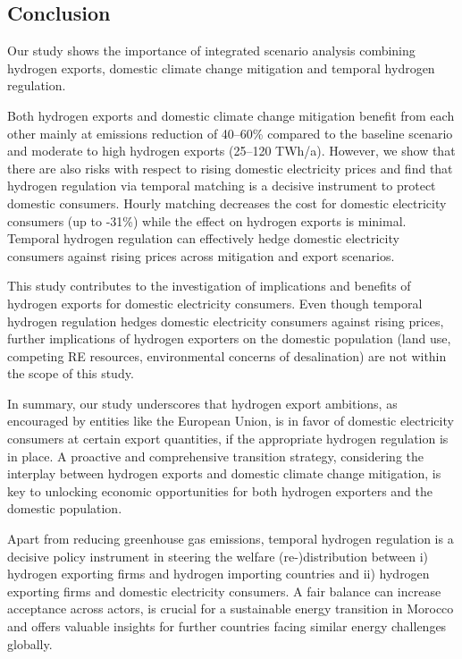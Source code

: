 \subsection*{Conclusion}


Our study shows the importance of integrated scenario analysis combining hydrogen exports, domestic climate change mitigation and temporal hydrogen regulation.

Both hydrogen exports and domestic climate change mitigation benefit from each other mainly at emissions reduction of 40--60\% compared to the baseline scenario and moderate to high hydrogen exports (25--120 TWh/a).
However, we show that there are also risks with respect to rising domestic electricity prices
and find that hydrogen regulation via temporal matching is a decisive instrument
to protect domestic consumers. Hourly matching decreases the cost for domestic electricity consumers (up to -31\%) while the effect on hydrogen exports is minimal. Temporal hydrogen regulation can effectively hedge domestic electricity consumers against rising prices across mitigation and export scenarios.

This study contributes to the investigation of implications and benefits of hydrogen exports for domestic electricity consumers. Even though temporal hydrogen regulation hedges domestic electricity consumers against rising prices, further implications of hydrogen exporters on the domestic population (land use, competing RE resources, environmental concerns of desalination) are not within the scope of this study.

In summary, our study underscores that hydrogen export ambitions, as encouraged by entities like the European Union, is in favor of domestic electricity consumers at certain export quantities, if the appropriate hydrogen regulation is in place. A proactive and comprehensive transition strategy, considering the interplay between hydrogen exports and domestic climate change mitigation, is key to unlocking economic opportunities for both hydrogen exporters and the domestic population. 


Apart from reducing greenhouse gas emissions, temporal hydrogen regulation is a decisive policy instrument in steering the welfare (re-)distribution between i) hydrogen exporting firms and hydrogen importing countries and ii) hydrogen exporting firms and domestic electricity consumers. 
A fair balance can increase acceptance across actors, is crucial for a sustainable energy transition in Morocco and offers valuable insights for further countries facing similar energy challenges globally.
